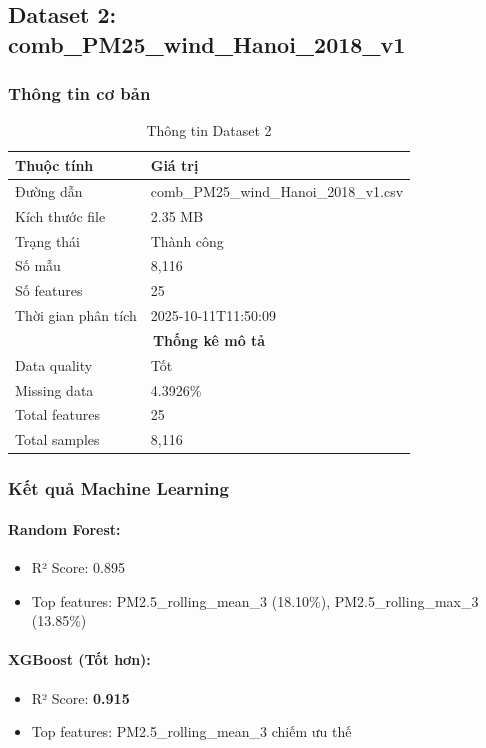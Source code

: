 \documentclass[12pt,a4paper]{article}
\begin{document}
\newpage
\subsection{Dataset 2: comb\_PM25\_wind\_Hanoi\_2018\_v1}

\subsubsection{Thông tin cơ bản}
\begin{table}[H]
\centering
\begin{tabular}{ll}
\toprule
\textbf{Thuộc tính} & \textbf{Giá trị}\\
\midrule
Đường dẫn & comb\_PM25\_wind\_Hanoi\_2018\_v1.csv\\
Kích thước file & 2.35 MB\\
Trạng thái & \textcolor{successcolor}{Thành công}\\
Số mẫu & 8,116\\
Số features & 25\\
Thời gian phân tích & 2025-10-11T11:50:09\\
\midrule
\multicolumn{2}{c}{\textbf{Thống kê mô tả}}\\
\midrule
Data quality & Tốt\\
Missing data & 4.3926\%\\
Total features & 25\\
Total samples & 8,116\\
\bottomrule
\end{tabular}
\caption{Thông tin Dataset 2}
\end{table}

\subsubsection{Kết quả Machine Learning}

\paragraph{Random Forest:}
\begin{itemize}
    \item R² Score: 0.895
    \item Top features: PM2.5\_rolling\_mean\_3 (18.10\%), PM2.5\_rolling\_max\_3 (13.85\%)
\end{itemize}

\paragraph{XGBoost (Tốt hơn):}
\begin{itemize}
    \item R² Score: \textbf{0.915}
    \item Top features: PM2.5\_rolling\_mean\_3 chiếm ưu thế
\end{itemize}
\end{document}
